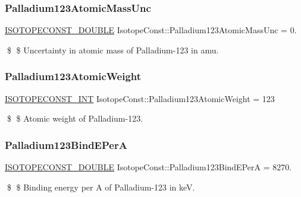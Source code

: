 \subsubsection{\texorpdfstring{Palladium123\+Atomic\+Mass\+Unc}{Palladium123AtomicMassUnc}}
{\footnotesize\ttfamily \mbox{\hyperlink{group___isotope_const-_macros_ga8f45a7272ce02c0b4c65c44636ed719a}{I\+S\+O\+T\+O\+P\+E\+C\+O\+N\+S\+T\+\_\+\+D\+O\+U\+B\+LE}} Isotope\+Const\+::\+Palladium123\+Atomic\+Mass\+Unc = 0.}

\$ \$ Uncertainty in atomic mass of Palladium-\/123 in amu. \mbox{\label{group___isotope_const-_palladium-_pd123_ga47c405d09491ba3b9cdc1abc2fe21a28}} 
\subsubsection{\texorpdfstring{Palladium123\+Atomic\+Weight}{Palladium123AtomicWeight}}
{\footnotesize\ttfamily \mbox{\hyperlink{group___isotope_const-_macros_ga5f18360b3e99483a35c32d789e62621c}{I\+S\+O\+T\+O\+P\+E\+C\+O\+N\+S\+T\+\_\+\+I\+NT}} Isotope\+Const\+::\+Palladium123\+Atomic\+Weight = 123}

\$ \$ Atomic weight of Palladium-\/123. \mbox{\label{group___isotope_const-_palladium-_pd123_gaf1625f72a07958b78545b9db5f3e4551}} 
\subsubsection{\texorpdfstring{Palladium123\+Bind\+E\+PerA}{Palladium123BindEPerA}}
{\footnotesize\ttfamily \mbox{\hyperlink{group___isotope_const-_macros_ga8f45a7272ce02c0b4c65c44636ed719a}{I\+S\+O\+T\+O\+P\+E\+C\+O\+N\+S\+T\+\_\+\+D\+O\+U\+B\+LE}} Isotope\+Const\+::\+Palladium123\+Bind\+E\+PerA = 8270.}

\$ \$ Binding energy per A of Palladium-\/123 in keV. \mbox{\label{group___isotope_const-_palladium-_pd123_gaa4f3e2140f53762fc07306a72bf360d1}} 
